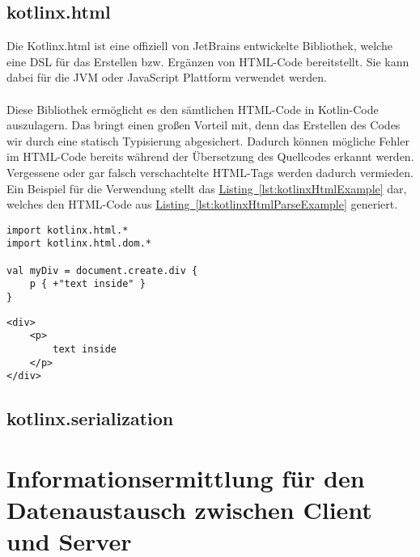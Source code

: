 \subsection{kotlinx.html}
Die Kotlinx.html ist eine offiziell von JetBrains entwickelte Bibliothek, welche eine \gls{DSL} für das Erstellen bzw. Ergänzen von HTML-Code bereitstellt. Sie kann dabei für die \gls{JVM} oder JavaScript Plattform verwendet werden.\\
\\
Diese Bibliothek ermöglicht es den sämtlichen HTML-Code in Kotlin-Code auszulagern. Das bringt einen großen Vorteil mit, denn das Erstellen des Codes wir durch eine statisch Typisierung abgesichert. Dadurch können mögliche Fehler im HTML-Code bereits während der Übersetzung des Quellcodes erkannt werden. Vergessene oder gar falsch verschachtelte HTML-Tags werden dadurch vermieden. Ein Beispiel für die Verwendung stellt das \hyperref[lst:kotlinxHtmlExample]{Listing~\ref{lst:kotlinxHtmlExample}} dar, welches den HTML-Code aus \hyperref[lst:kotlinxHtmlParseExample]{Listing~\ref{lst:kotlinxHtmlParseExample}} generiert.
\begin{lstlisting}[style=lstStyleFramed, caption={[Beispiel: Verwendung der Bibliothek kontlinx.html\protect\footnote{Quelle: \cite{kotlinxHtmlExample}}] Beispiel: Verwendung der Bibliothek kontlinx.html\protect\footnotemark}, label=lst:kotlinxHtmlExample]
import kotlinx.html.*
import kotlinx.html.dom.*

val myDiv = document.create.div {
	p { +"text inside" }
}
\end{lstlisting}
\begin{lstlisting}[style=lstStyleFramed, caption={Beispiel: Verwendung der Bibliothek kotlinx.html (Ergebnis)}, label=lst:kotlinxHtmlParseExample]
<div>
	<p>
		text inside
	</p>
</div>
\end{lstlisting}

\subsection{kotlinx.serialization}


\section{Informationsermittlung für den Datenaustausch zwischen Client und Server}

